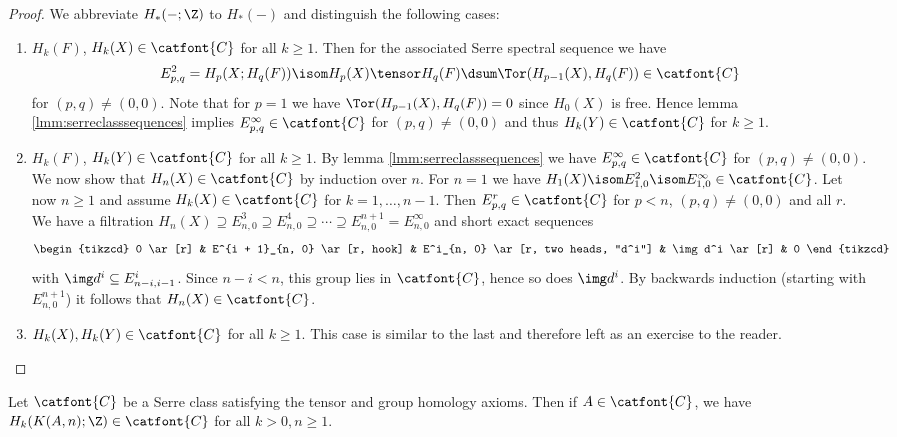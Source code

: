 \begin{proof}
	We abbreviate $H_*({{-}}; \Z)$ to $H_*({{-}})$ and distinguish the following cases:
	\begin{enumerate}
		\item $H_k(F)$, $H_k(X) \in \catfont{C}$ for all $k \geq 1$.
			Then for the associated Serre spectral sequence we have
			\begin{equation*}
				E^2_{p, q} = H_p(X; H_q(F)) \isom H_p(X) \tensor H_q(F) \dsum \Tor(H_{p - 1}(X), H_q(F)) \in \catfont{C}
			\end{equation*}
			for $(p, q) \neq (0, 0)$.
			Note that for $p = 1$ we have $\Tor(H_{p - 1}(X), H_q(F)) = 0$ since $H_0(X)$ is free.
			Hence lemma \ref{lmm:serreclasssequences} implies $E^\infty_{p, q} \in \catfont{C}$ for $(p, q) \neq (0, 0)$ and thus $H_k(Y) \in \catfont{C}$ for $k \geq 1$.
		\item $H_k(F)$, $H_k(Y) \in \catfont{C}$ for all $k \geq 1$.
			By lemma \ref{lmm:serreclasssequences} we have $E^\infty_{p, q} \in \catfont{C}$ for $(p, q) \neq (0, 0)$.
			We now show that $H_n(X) \in \catfont{C}$ by induction over $n$.
			For $n = 1$ we have $H_1(X) \isom E^2_{1, 0} \isom E^\infty_{1, 0} \in \catfont{C}$.
			Let now $n \geq 1$ and assume $H_k(X) \in \catfont{C}$ for $k = 1, \ldots, n - 1$.
			Then $E^r_{p, q} \in \catfont{C}$ for $p < n$, $(p, q) \neq (0, 0)$ and all $r$.
			We have a filtration $H_n(X) \supseteq E^3_{n, 0} \supseteq E^4_{n, 0} \supseteq \cdots \supseteq E^{n + 1}_{n, 0} = E_{n, 0}^\infty$ and short exact sequences
			\begin{equation*}
				\begin{tikzcd}
					0
							\ar[r]
						& E^{i + 1}_{n, 0}
							\ar[r, hook]
						& E^i_{n, 0}
							\ar[r, two heads, "d^i"]
						& \img d^i
							\ar[r]
						& 0
				\end{tikzcd}
			\end{equation*}
			with $\img d^i \subseteq E^i_{n - i, i - 1}$.
			Since $n - i < n$, this group lies in $\catfont{C}$, hence so does $\img d^i$.
			By backwards induction (starting with $E^{n + 1}_{n, 0}$) it follows that $H_n(X) \in \catfont{C}$.
		\item $H_k(X), H_k(Y) \in \catfont{C}$ for all $k \geq 1$.
			This case is similar to the last and therefore left as an exercise to the reader.
			\qedhere
	\end{enumerate}
\end{proof}
\begin{corollary}\label{crl:maclanespaceserreclass}
	Let $\catfont{C}$ be a Serre class satisfying the tensor and group homology axioms.
	Then if $A \in \catfont{C}$, we have $H_k(K(A, n); \Z) \in \catfont{C}$ for all $k > 0, n \geq 1$.
\end{corollary}
